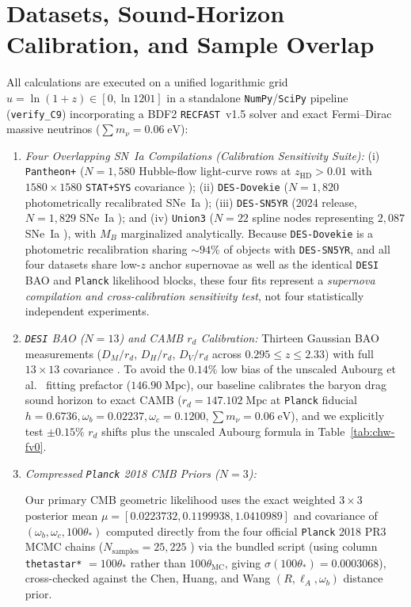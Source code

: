 \documentclass[11pt,a4paper]{article}
\begin{document}
\section{Datasets, Sound-Horizon Calibration, and Sample Overlap}
\label{sec:pipeline}
All calculations are executed on a unified logarithmic grid $u = \ln(1+z) \in [0, \ln 1201]$ in a standalone \texttt{NumPy}/\texttt{SciPy} pipeline (\texttt{verify\_C9}) incorporating a BDF2 \texttt{RECFAST}~v1.5 solver and exact Fermi--Dirac massive neutrinos ($\sum m_\nu = 0.06\;\mathrm{eV}$):
\begin{enumerate}
    \item \textit{Four Overlapping SN~Ia Compilations (Calibration Sensitivity Suite):} (i) \texttt{Pantheon+} ($N = 1,580$ Hubble-flow light-curve rows at $z_{\mathrm{HD}} > 0.01$ with $1580\times 1580$ \texttt{STAT+SYS} covariance \cite{Brout2022}); (ii) \texttt{DES-Dovekie} ($N = 1,820$ photometrically recalibrated SNe~Ia \cite{PopovicDovekie2025}); (iii) \texttt{DES-SN5YR} (2024 release, $N = 1,829$ SNe~Ia \cite{DESSN5YR2024}); and (iv) \texttt{Union3} ($N = 22$ spline nodes representing $2,087$ SNe~Ia \cite{RubinUnion3_2025}), with $M_B$ marginalized analytically. Because \texttt{DES-Dovekie} is a photometric recalibration sharing $\sim 94\%$ of objects with \texttt{DES-SN5YR}, and all four datasets share low-$z$ anchor supernovae as well as the identical \texttt{DESI} BAO and \texttt{Planck} likelihood blocks, these four fits represent a \textit{supernova compilation and cross-calibration sensitivity test}, not four statistically independent experiments.
    \item \textit{\texttt{DESI} BAO ($N = 13$) and CAMB $r_d$ Calibration:} Thirteen Gaussian BAO measurements ($D_M/r_d$, $D_H/r_d$, $D_V/r_d$ across $0.295 \le z \le 2.33$) with full $13\times 13$ covariance \cite{DESI2024VI,DESIDR2_2025}. To avoid the $0.14\%$ low bias of the unscaled Aubourg et al.\ \cite{Aubourg2015BAO} fitting prefactor ($146.90\;\mathrm{Mpc}$), our baseline calibrates the baryon drag sound horizon to exact CAMB ($r_d = 147.102\;\mathrm{Mpc}$ at \texttt{Planck} fiducial $h=0.6736, \omega_b=0.02237, \omega_c=0.1200, \sum m_\nu = 0.06\;\mathrm{eV}$), and we explicitly test $\pm 0.15\%$ $r_d$ shifts plus the unscaled Aubourg formula in Table~\ref{tab:chw-fv0}.
    \item \textit{Compressed \texttt{Planck} 2018 CMB Priors ($N = 3$):} {\sloppy Our primary CMB geometric likelihood uses the exact weighted $3\times 3$ posterior mean $\mu = [0.0223732, 0.1199938, 1.0410989]$ and covariance of $(\omega_b, \omega_c, 100\theta_*)$ computed directly from the four official \texttt{Planck} 2018 PR3  MCMC chains ($N_{\mathrm{samples}} = 25,225$ \cite{Planck2018VI}) via the bundled script  (using column \texttt{thetastar*} $= 100\theta_*$ rather than $100\theta_{\mathrm{MC}}$, giving $\sigma(100\theta_*) = 0.0003068$), cross-checked against the Chen, Huang, and Wang \cite{ChenHuangWang2019} $(R, \ell_A, \omega_b)$ distance prior.\par}
\end{enumerate}
\end{document}
